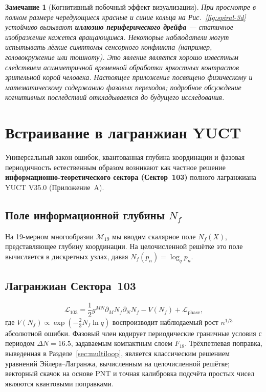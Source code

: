 \documentclass[12pt,a4paper]{article}
\newtheorem{remark}[theorem]{Замечание}
\begin{document}
	\begin{remark}[Когнитивный побочный эффект визуализации]
		При просмотре в полном размере чередующиеся красные и синие кольца на Рис.~\ref{fig:spiral-3d} устойчиво вызывают \textbf{иллюзию периферического дрейфа} — статичное изображение кажется вращающимся. Некоторые наблюдатели могут испытывать лёгкие симптомы сенсорного конфликта (например, головокружение или тошноту). Это явление является хорошо известным следствием асимметричной временной обработки яркостных контрастов зрительной корой человека. Настоящее приложение посвящено физическому и математическому содержанию фазовых переходов; подробное обсуждение когнитивных последствий откладывается до будущего исследования.
	\end{remark}
	
	\section{Встраивание в лагранжиан YUCT}
	\label{sec:lagrangian-embedding}
	
	Универсальный закон ошибок, квантованная глубина координации и фазовая периодичность естественным образом возникают как частное решение \textbf{информационно-теоретического сектора (Сектор~103)} полного лагранжиана YUCT V35.0 (Приложение~A).
	
	\subsection{Поле информационной глубины \(N_f\)}
	На 19-мерном многообразии \(\mathcal{M}_{19}\) мы вводим скалярное поле \(N_f(X)\), представляющее глубину координации. На целочисленной решётке это поле вычисляется в дискретных узлах, давая \(N_f(p_n) = \log_q p_n\).
	
	\subsection{Лагранжиан Сектора~103}
	\[
	\mathcal{L}_{103} = \frac12 g^{MN}\partial_M N_f\partial_N N_f - V(N_f) + \mathcal{L}_{\mathrm{phase}},
	\]
	где \(V(N_f) \propto \exp(-\frac23 N_f\ln q)\) воспроизводит наблюдаемый рост \(n^{1/3}\) абсолютной ошибки. Фазовый член кодирует периодические граничные условия с периодом \(\Delta N = 16.5\), задаваемым компактным слоем \(F_{18}\). Трёхпетлевая поправка, выведенная в Разделе~\ref{sec:multiloop}, является классическим решением уравнений Эйлера–Лагранжа, вычисленным на целочисленной решётке; векторный скачок на основе PNT и точная калибровка подсчёта простых чисел являются квантовыми поправками.
	
\end{document}
